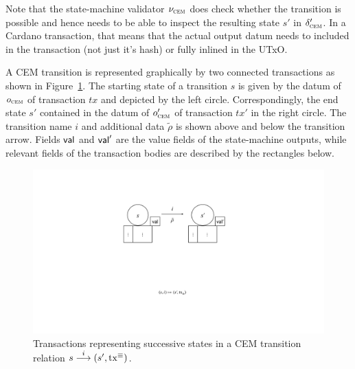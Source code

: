 Note that the state-machine validator $\nu_{\textsc{cem}}$ does check whether the
transition is possible and hence needs to be able to inspect the resulting state
$s'$ in $\delta_{\textsc{cem}}'$. In a Cardano transaction, that means that the actual output
datum needs to included in the transaction (not just it's hash) or fully inlined
in the UTxO.

A CEM transition is represented graphically by two connected transactions as
shown in Figure~\ref{fig:state-transition}. The starting state of a transition
$s$ is given by the datum of $o_{\textsc{cem}}$ of transaction $tx$ and depicted by the
left circle. Correspondingly, the end state $s'$ contained in the datum of
$o_{\textsc{cem}}'$ of transaction $tx'$ in the right circle. The transition name $i$ and
additional data $\tilde \rho$ is shown above and below the transition arrow.
Fields $\mathsf{val}$ and $\mathsf{val}'$ are the value fields of the state-machine outputs,
while relevant fields of the transaction bodies are described by the rectangles
below.

\begin{figure}[h]
  \centering
  \includegraphics[scale=.2,width=\textwidth/2]{figures/state-transition_cropped.pdf}
  \caption{Transactions representing successive states in a CEM
    transition relation \({s}\overset{i}\longrightarrow(s', \mathrm{tx}^\equiv)\).}\label{fig:state-transition}
\end{figure}


